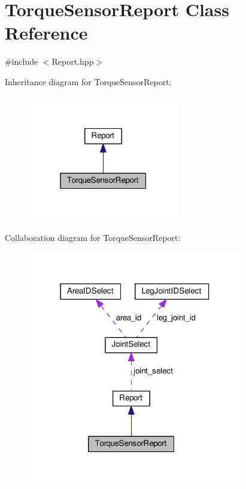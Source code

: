 \hypertarget{classTorqueSensorReport}{}\section{Torque\+Sensor\+Report Class Reference}
\label{classTorqueSensorReport}


{\ttfamily \#include $<$Report.\+hpp$>$}



Inheritance diagram for Torque\+Sensor\+Report\+:\nopagebreak
\begin{figure}[H]
\begin{center}
\leavevmode
\includegraphics[width=187pt]{classTorqueSensorReport__inherit__graph}
\end{center}
\end{figure}


Collaboration diagram for Torque\+Sensor\+Report\+:\nopagebreak
\begin{figure}[H]
\begin{center}
\leavevmode
\includegraphics[width=266pt]{classTorqueSensorReport__coll__graph}
\end{center}
\end{figure}
